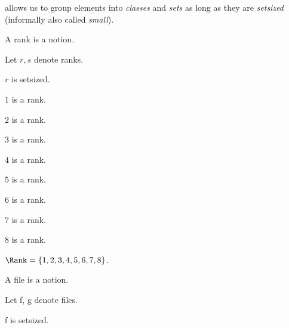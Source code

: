 \Naproche{} allows us to group elements into \textit{classes} and \textit{sets} as long as they are \textit{setsized} (informally also called \textit{small}).
\begin{forthel}
    \begin{signature} A rank is a notion. \end{signature}
    Let $r, s$ denote ranks.

    \begin{axiom} $r$ is setsized. \end{axiom}

    \begin{signature} $1$ is a rank. \end{signature}
    \begin{signature} $2$ is a rank. \end{signature}
    \begin{signature} $3$ is a rank. \end{signature}
    \begin{signature} $4$ is a rank. \end{signature}
    \begin{signature} $5$ is a rank. \end{signature}
    \begin{signature} $6$ is a rank. \end{signature}
    \begin{signature} $7$ is a rank. \end{signature}
    \begin{signature} $8$ is a rank. \end{signature}

    \begin{definition} $\Rank = \{1,2,3,4,5,6,7,8\}$. \end{definition}

    \begin{signature} A file is a notion. \end{signature}
    Let f, g denote files.

    \begin{axiom} f is setsized. \end{axiom}


\end{forthel}
